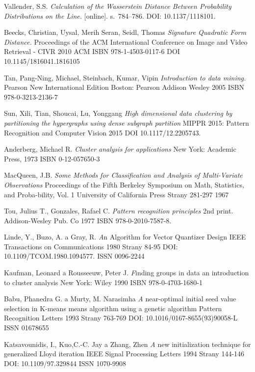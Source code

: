 \begin{thebibliography}{99}
{\sc Vallender,} S.S.
\emph{Calculation of the Wasserstein Distance Between Probability Distributions on the Line.}
[online]. s.~784--786. DOI: 10.1137/1118101.

{\sc Beecks,} Christian, {\sc Uysal,} Merih Seran, {\sc Seidl,} Thomas
\emph{Signature Quadratic Form Distance.}
Proceedings of the ACM International Conference on Image and Video Retrieval - CIVR
2010
ACM
ISBN 978-1-4503-0117-6
DOI 10.1145/1816041.1816105

{\sc Tan,} Pang-Ning, {\sc Michael,} Steinbach, {\sc Kumar,} Vipin
\emph{Introduction to data mining.}
Pearson New International Edition
Boston: Pearson Addison Wesley
2005
ISBN 978-0-3213-2136-7

{\sc Sun,} Xili, {\sc Tian,} Shoucai, {\sc Lu,} Yonggang
\emph{High dimensional data clustering by partitioning the hypergraphs using dense subgraph partition}
MIPPR 2015: Pattern Recognition and Computer Vision
2015
DOI 10.1117/12.2205743.

{\sc Anderberg,} Michael R.
\emph{Cluster analysis for applications}
New York: Academic Press, 1973
ISBN 0-12-057650-3

{\sc MacQueen}, J.B.
\emph{Some Methods for Classification and Analysis of Multi-Variate Observations}
Proceedings of the Fifth Berkeley Symposium on Math, Statistics, and Proba-bility, Vol. 1
University of California Press
Strany 281-297
1967

{\sc Tou}, Julius T., {\sc Gonzales},  Rafael C.
\emph{Pattern recognition principles}
2nd print.
Addison-Wesley Pub. Co
1977
ISBN 978-0-2010-7587-8.

{\sc Linde}, Y., {\sc Buzo}, A. a {\sc Gray}, R.
{\emph An Algorithm for Vector Quantizer Design}
IEEE Transactions on Communications
1980
Strany 84-95
DOI: 10.1109/TCOM.1980.1094577. ISSN 0096-2244

{\sc Kaufman}, Leonard a {\sc Rousseeuw}, Peter J.
{\emph Finding groups in data an introduction to cluster analysis}
New York: Wiley
1990
ISBN 978-0-4703-1680-1

{\sc Babu}, Phanedra G. a {\sc Murty}, M. Narasimha
{\emph A near-optimal initial seed value selection in K-means means algorithm using a genetic algorithm}
Pattern Recognition Letters
1993
Strany 763-769
DOI: 10.1016/0167-8655(93)90058-L
ISSN 01678655

{\sc Katsavounidis},  I., {\sc Kuo},C.-C. Jay a {\sc Zhang}, Zhen
{\emph A new initialization technique for generalized Lloyd iteration}
IEEE Signal Processing Letters
1994
Strany 144-146
DOI: 10.1109/97.329844
ISSN 1070-9908


\end{thebibliography}
